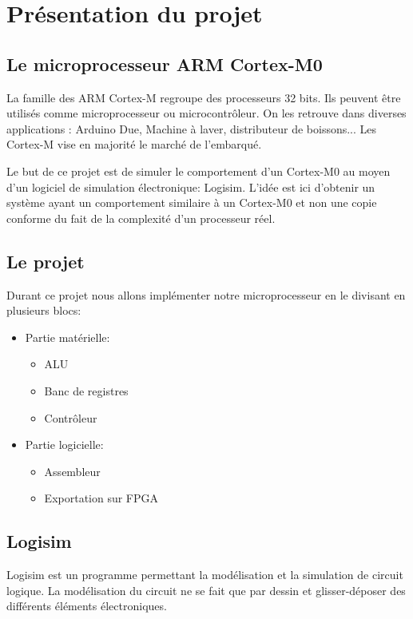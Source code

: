 \section{Présentation du projet}
\subsection{Le microprocesseur ARM Cortex-M0}
	La famille des ARM Cortex-M regroupe des processeurs 32 bits. Ils peuvent être utilisés comme microprocesseur ou microcontrôleur. On les retrouve dans diverses applications : Arduino Due,  Machine à laver, distributeur de boissons...  Les Cortex-M vise en majorité le marché de l'embarqué.

	Le but de ce projet est de simuler le comportement d'un Cortex-M0 au moyen d'un logiciel de simulation électronique: Logisim. L'idée est ici d'obtenir un système ayant un comportement similaire à un Cortex-M0 et non une copie conforme du fait de la complexité d'un processeur réel.

\subsection{Le projet}
	Durant ce projet nous allons implémenter notre microprocesseur en le divisant en plusieurs blocs:
\begin{itemize}
	\item Partie matérielle:
	\begin{itemize}
		\item ALU
		\item Banc de registres
		\item Contrôleur
	\end{itemize}
	\item Partie logicielle:
	\begin{itemize}
		\item Assembleur
		\item Exportation sur FPGA
	\end{itemize}
\end{itemize}

\subsection{Logisim}

Logisim est un programme permettant la modélisation et la simulation de circuit logique. La modélisation du circuit ne se fait que par dessin et glisser-déposer des différents éléments électroniques.

